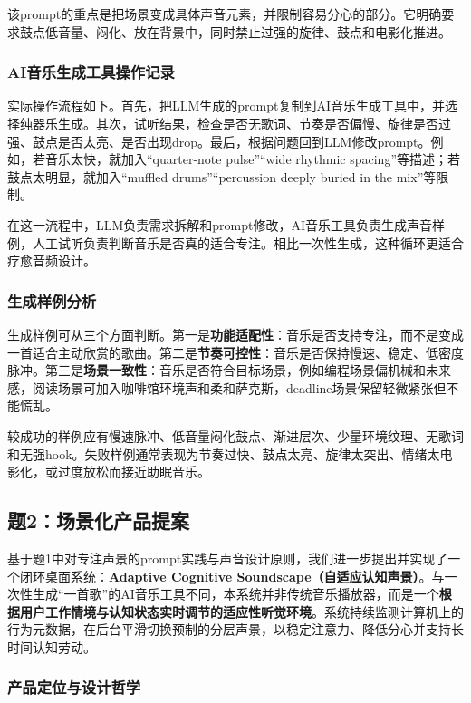 \documentclass[12pt, fontset=windows]{ctexart}
\begin{document}
该prompt的重点是把场景变成具体声音元素，并限制容易分心的部分。它明确要求鼓点低音量、闷化、放在背景中，同时禁止过强的旋律、鼓点和电影化推进。

\subsubsection{AI音乐生成工具操作记录}

实际操作流程如下。首先，把LLM生成的prompt复制到AI音乐生成工具中，并选择纯器乐生成。其次，试听结果，检查是否无歌词、节奏是否偏慢、旋律是否过强、鼓点是否太亮、是否出现drop。最后，根据问题回到LLM修改prompt。例如，若音乐太快，就加入“quarter-note pulse”“wide rhythmic spacing”等描述；若鼓点太明显，就加入“muffled drums”“percussion deeply buried in the mix”等限制。

在这一流程中，LLM负责需求拆解和prompt修改，AI音乐工具负责生成声音样例，人工试听负责判断音乐是否真的适合专注。相比一次性生成，这种循环更适合疗愈音频设计。

\subsubsection{生成样例分析}

生成样例可从三个方面判断。第一是\textbf{功能适配性}：音乐是否支持专注，而不是变成一首适合主动欣赏的歌曲。第二是\textbf{节奏可控性}：音乐是否保持慢速、稳定、低密度脉冲。第三是\textbf{场景一致性}：音乐是否符合目标场景，例如编程场景偏机械和未来感，阅读场景可加入咖啡馆环境声和柔和萨克斯，deadline场景保留轻微紧张但不能慌乱。

较成功的样例应有慢速脉冲、低音量闷化鼓点、渐进层次、少量环境纹理、无歌词和无强hook。失败样例通常表现为节奏过快、鼓点太亮、旋律太突出、情绪太电影化，或过度放松而接近助眠音乐。

\subsection{题2：场景化产品提案}

基于题1中对专注声景的prompt实践与声音设计原则，我们进一步提出并实现了一个闭环桌面系统：\textbf{Adaptive Cognitive Soundscape（自适应认知声景）}。与一次性生成“一首歌”的AI音乐工具不同，本系统并非传统音乐播放器，而是一个\textbf{根据用户工作情境与认知状态实时调节的适应性听觉环境}。系统持续监测计算机上的行为元数据，在后台平滑切换预制的分层声景，以稳定注意力、降低分心并支持长时间认知劳动。

\subsubsection{产品定位与设计哲学}
\end{document}
